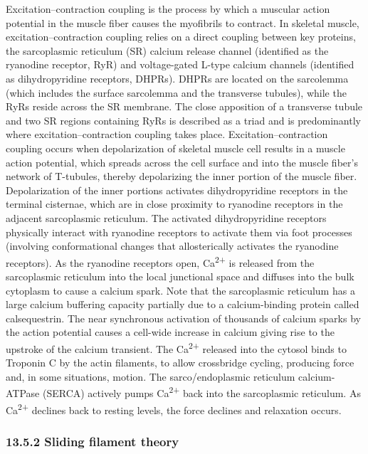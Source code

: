 Excitation--contraction coupling is the process by which a muscular
action potential in the muscle fiber causes the myofibrils to contract.
In skeletal muscle, excitation--contraction coupling relies on a direct
coupling between key proteins, the sarcoplasmic reticulum (SR) calcium
release channel (identified as the ryanodine receptor, RyR) and
voltage-gated L-type calcium channels (identified as dihydropyridine
receptors, DHPRs). DHPRs are located on the sarcolemma (which includes
the surface sarcolemma and the transverse tubules), while the RyRs
reside across the SR membrane. The close apposition of a transverse
tubule and two SR regions containing RyRs is described as a triad and is
predominantly where excitation--contraction coupling takes place.
Excitation--contraction coupling occurs when depolarization of skeletal
muscle cell results in a muscle action potential, which spreads across
the cell surface and into the muscle fiber's network of T-tubules,
thereby depolarizing the inner portion of the muscle fiber.
Depolarization of the inner portions activates dihydropyridine receptors
in the terminal cisternae, which are in close proximity to ryanodine
receptors in the adjacent sarcoplasmic reticulum. The activated
dihydropyridine receptors physically interact with ryanodine receptors
to activate them via foot processes (involving conformational changes
that allosterically activates the ryanodine receptors). As the ryanodine
receptors open, Ca\textsuperscript{2+} is released from the sarcoplasmic
reticulum into the local junctional space and diffuses into the bulk
cytoplasm to cause a calcium spark. Note that the sarcoplasmic reticulum
has a large calcium buffering capacity partially due to a
calcium-binding protein called calsequestrin. The near synchronous
activation of thousands of calcium sparks by the action potential causes
a cell-wide increase in calcium giving rise to the upstroke of the
calcium transient. The Ca\textsuperscript{2+} released into the cytosol
binds to Troponin C by the actin filaments, to allow crossbridge
cycling, producing force and, in some situations, motion. The
sarco/endoplasmic reticulum calcium-ATPase (SERCA) actively pumps
Ca\textsuperscript{2+} back into the sarcoplasmic reticulum. As
Ca\textsuperscript{2+} declines back to resting levels, the force
declines and relaxation occurs.

\hypertarget{sliding-filament-theory}{%
\subsubsection{\texorpdfstring{{13.5.2} Sliding filament
theory}{13.5.2 Sliding filament theory}}\label{sliding-filament-theory}}

